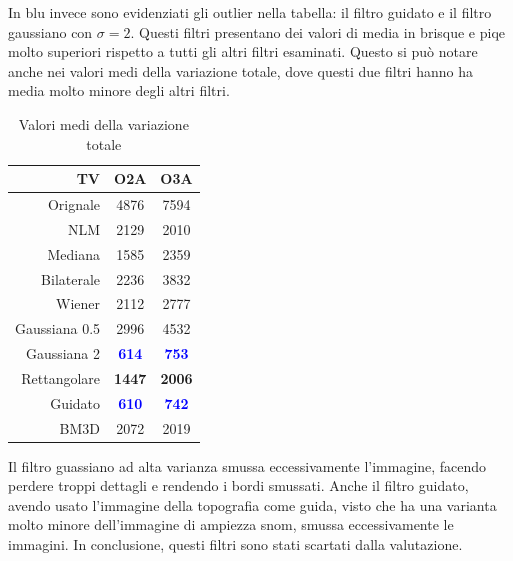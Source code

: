 \documentclass[../main.tex]{subfiles}
\begin{document}
In blu invece sono evidenziati gli outlier nella tabella: il filtro guidato e il filtro gaussiano con $\sigma = 2$. Questi filtri presentano dei valori di media in \acrshort{brisque} e \acrshort{piqe} molto superiori rispetto a tutti gli altri filtri esaminati. Questo si può notare anche nei valori medi della variazione totale, dove questi due filtri hanno ha media molto minore degli altri filtri.

\begin{table}[h]
	\centering
	\begin{tabular}{r||c|c}
		TV\hspace{10pt}	& O2A  & O3A \\\hline\hline
		Orignale   		& 4876 & 7594\\
		NLM         	& 2129 & 2010\\
		Mediana     	& 1585 & 2359\\
		Bilaterale    	& 2236 & 3832\\
		Wiener        	& 2112 & 2777\\
		Gaussiana 0.5 	& 2996 & 4532\\
		Gaussiana 2   	& \textcolor{blue}{\textbf{614}}  & \textcolor{blue}{\textbf{753}}\\
		Rettangolare 	& \textbf{1447} & \textbf{2006}\\
		Guidato        	& \textcolor{blue}{\textbf{610}}  & \textcolor{blue}{\textbf{742}}\\
		BM3D   			& 2072 & 2019
	\end{tabular}
	\caption{Valori medi della variazione totale}
\end{table}

Il filtro guassiano ad alta varianza smussa eccessivamente l'immagine, facendo perdere troppi dettagli e rendendo i bordi smussati. Anche il filtro guidato, avendo usato l'immagine della topografia come guida, visto che ha una varianta molto minore dell'immagine di ampiezza \acrshort{snom}, smussa eccessivamente le immagini. In conclusione, questi filtri sono stati scartati dalla valutazione.\\
\end{document}
